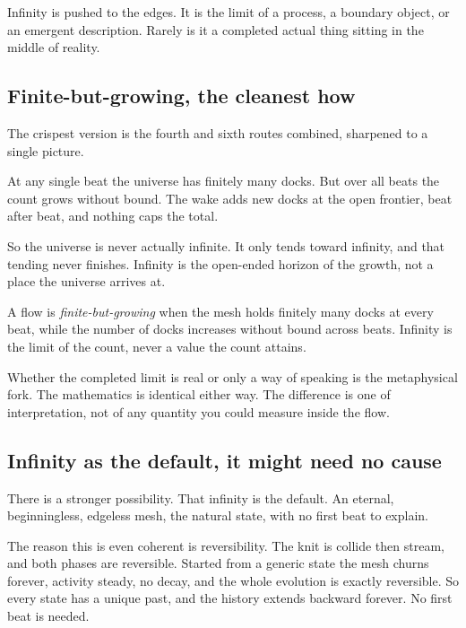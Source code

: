 \begin{result}
Infinity is pushed to the edges. It is the limit of a process, a boundary object, or an emergent description. Rarely is it a completed actual thing sitting in the middle of reality.
\end{result}

\subsection{Finite-but-growing, the cleanest how}

The crispest version is the fourth and sixth routes combined, sharpened to a single picture.

At any single beat the universe has finitely many docks. But over all beats the count grows without bound. The wake adds new docks at the open frontier, beat after beat, and nothing caps the total.

So the universe is never actually infinite. It only tends toward infinity, and that tending never finishes. Infinity is the open-ended horizon of the growth, not a place the universe arrives at.

\begin{definition}
A flow is \emph{finite-but-growing} when the mesh holds finitely many docks at every beat, while the number of docks increases without bound across beats. Infinity is the limit of the count, never a value the count attains.
\end{definition}

Whether the completed limit is real or only a way of speaking is the metaphysical fork. The mathematics is identical either way. The difference is one of interpretation, not of any quantity you could measure inside the flow.

\subsection{Infinity as the default, it might need no cause}

There is a stronger possibility. That infinity is the default. An eternal, beginningless, edgeless mesh, the natural state, with no first beat to explain.

The reason this is even coherent is reversibility. The knit is collide then stream, and both phases are reversible. Started from a generic state the mesh churns forever, activity steady, no decay, and the whole evolution is exactly reversible. So every state has a unique past, and the history extends backward forever. No first beat is needed.

